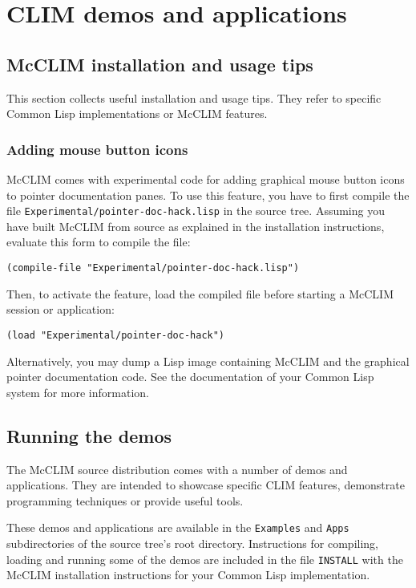 \chapter{CLIM demos and applications}

\section{McCLIM installation and usage tips}

This section collects useful installation and usage tips.  They refer to
specific Common Lisp implementations or McCLIM features.

\subsection{Adding mouse button icons}

McCLIM comes with experimental code for adding graphical mouse button
icons to pointer documentation panes.  To use this feature, you have to
first compile the file \texttt{Experimental/pointer-doc-hack.lisp} in the
source tree.  Assuming you have built McCLIM from source as explained in
the installation instructions, evaluate this form to compile the file:
\begin{verbatim}
(compile-file "Experimental/pointer-doc-hack.lisp")
\end{verbatim}
Then, to activate the feature, load the compiled file before starting a
McCLIM session or application:
\begin{verbatim}
(load "Experimental/pointer-doc-hack")
\end{verbatim}
Alternatively, you may dump a Lisp image containing McCLIM and the
graphical pointer documentation code.  See the documentation of your
Common Lisp system for more information.

\section{Running the demos}

The McCLIM source distribution comes with a number of demos and
applications.  They are intended to showcase specific CLIM features,
demonstrate programming techniques or provide useful tools.

These demos and applications are available in the \texttt{Examples}
and \texttt{Apps} subdirectories of the source tree's root directory.
Instructions for compiling, loading and running some of the demos are
included in the file \texttt{INSTALL} with the McCLIM installation
instructions for your Common Lisp implementation.

